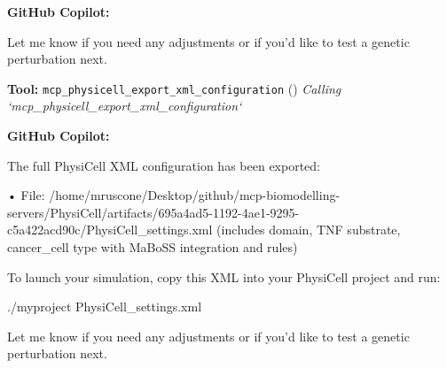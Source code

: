 \documentclass[11pt,a4paper]{article}
\begin{document}
\begin{copilotbox}
\textbf{GitHub Copilot:}

Let me know if you need any adjustments or if you’d like to test a genetic perturbation next.

\end{copilotbox}
\begin{toolokbox}
\textbf{Tool:} \texttt{mcp\_physicell\_export\_xml\_configuration} (\checkmark)
\textit{Calling `mcp\_physicell\_export\_xml\_configuration`}
\end{toolokbox}
\begin{copilotbox}
\textbf{GitHub Copilot:}

The full PhysiCell XML configuration has been exported:

• File: /home/mruscone/Desktop/github/mcp-biomodelling-servers/PhysiCell/artifacts/695a4ad5-1192-4ae1-9295-c5a422acd90c/PhysiCell\_settings.xml  
  (includes domain, TNF substrate, cancer\_cell type with MaBoSS integration and rules)

To launch your simulation, copy this XML into your PhysiCell project and run:

./myproject PhysiCell\_settings.xml

Let me know if you need any adjustments or if you’d like to test a genetic perturbation next.

\end{copilotbox}
\end{document}
